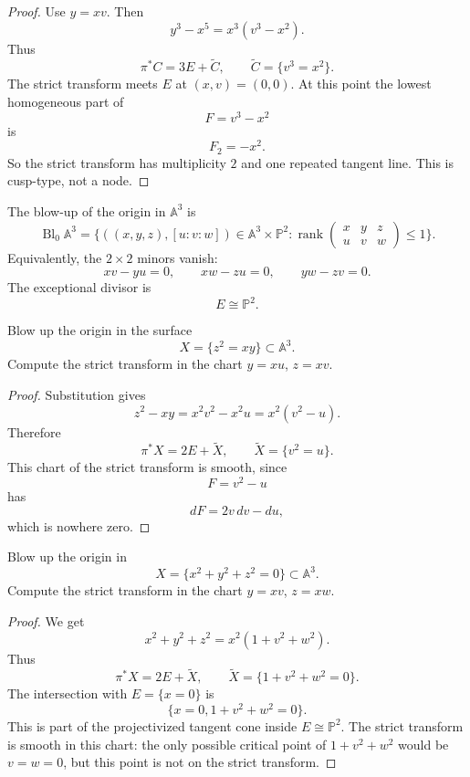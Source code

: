 \begin{proof}
Use $y=xv$. Then
$$
y^3-x^5=x^3(v^3-x^2).
$$
Thus
$$
\pi^*C=3E+\widetilde C,
\qquad
\widetilde C=\{v^3=x^2\}.
$$
The strict transform meets $E$ at $(x,v)=(0,0)$.
At this point the lowest homogeneous part of
$$
F=v^3-x^2
$$
is
$$
F_2=-x^2.
$$
So the strict transform has multiplicity $2$ and one
repeated tangent line. This is cusp-type, not a node.
\end{proof}

\medskip\noindent
The blow-up of the origin in $\mathbb{A}^3$ is
$$
\operatorname{Bl}_0\mathbb{A}^3
=
\{((x,y,z),[u:v:w])\in \mathbb{A}^3\times
\mathbb{P}^2:\operatorname{rank}
\begin{pmatrix}
x&y&z\\
u&v&w
\end{pmatrix}
\leq 1\}.
$$
Equivalently, the $2\times 2$ minors vanish:
$$
xv-yu=0,
\qquad
xw-zu=0,
\qquad
yw-zv=0.
$$
The exceptional divisor is
$$
E\cong \mathbb{P}^2.
$$

\begin{exercise}
\label{exercise-blow-up-ordinary-double-surface}
Blow up the origin in the surface
$$
X=\{z^2=xy\}\subset \mathbb{A}^3.
$$
Compute the strict transform in the chart
$y=xu$, $z=xv$.
\end{exercise}

\begin{proof}
Substitution gives
$$
z^2-xy=x^2v^2-x^2u=x^2(v^2-u).
$$
Therefore
$$
\pi^*X=2E+\widetilde X,
\qquad
\widetilde X=\{v^2=u\}.
$$
This chart of the strict transform is smooth, since
$$
F=v^2-u
$$
has
$$
dF=2v\,dv-du,
$$
which is nowhere zero.
\end{proof}

\begin{exercise}
\label{exercise-blow-up-quadratic-cone}
Blow up the origin in
$$
X=\{x^2+y^2+z^2=0\}\subset \mathbb{A}^3.
$$
Compute the strict transform in the chart
$y=xv$, $z=xw$.
\end{exercise}

\begin{proof}
We get
$$
x^2+y^2+z^2=x^2(1+v^2+w^2).
$$
Thus
$$
\pi^*X=2E+\widetilde X,
\qquad
\widetilde X=\{1+v^2+w^2=0\}.
$$
The intersection with $E=\{x=0\}$ is
$$
\{x=0,1+v^2+w^2=0\}.
$$
This is part of the projectivized tangent cone inside
$E\cong \mathbb{P}^2$.
The strict transform is smooth in this chart: the only
possible critical point of $1+v^2+w^2$ would be
$v=w=0$, but this point is not on the strict transform.
\end{proof}


